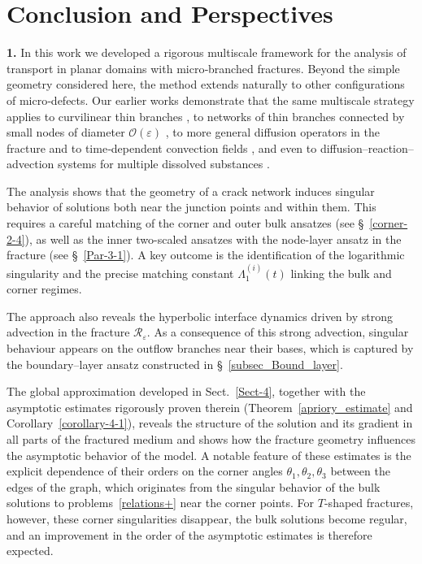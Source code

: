 \documentclass[reqno]{amsart}            %
\numberwithin{equation}{section}
\begin{document}
	
	\section{Conclusion and Perspectives}\label{Sect-5}
	
	\textbf{1.} 	
	In this work we developed a rigorous multiscale framework for the analysis of
	transport in planar domains with micro‑branched fractures. Beyond the simple
	geometry considered here, the method extends naturally to other configurations
	of micro‑defects. Our earlier works demonstrate that the same multiscale
	strategy applies to curvilinear thin branches \cite{Mel-Roh_AA-2024}, to
	networks of thin branches connected by small nodes of diameter
	$\mathcal{O}(\varepsilon)$ \cite{Mel-Roh_JMAA-2024}, to more general diffusion
	operators in the fracture and to time‑dependent convection fields
	\cite{Mel-Roh_JMAA-2024}, and even to diffusion–reaction–advection systems for
	multiple dissolved substances \cite{Mel-Pop-Rohde-preprint-2026}.
	
	The analysis shows that the geometry of a crack network induces singular behavior of solutions both near the junction points and within them. This requires a careful matching of the corner and outer bulk ansatzes (see \S~\ref{corner-2-4}), as well as the inner two-scaled ansatzes with the node-layer ansatz in the fracture (see \S~\ref{Par-3-1}). A key outcome  is the identification of the logarithmic
	singularity and the precise matching constant $\Lambda^{(i)}_1(t)$ linking the bulk and corner regimes.
	
	The approach also reveals the hyperbolic interface dynamics driven by strong
	advection in the fracture $\mathcal{R}_\varepsilon$. As a consequence of this
	strong advection, singular behaviour appears on the outflow branches near their
	bases, which is captured by the boundary–layer ansatz constructed in
	\S~\ref{subsec_Bound_layer}.
	
	The global approximation developed in Sect.~\ref{Sect-4}, together with the
	asymptotic estimates rigorously proven therein (Theorem~\ref{apriory_estimate}
	and Corollary~\ref{corollary-4-1}), reveals the structure of the solution and
	its gradient in all parts of the fractured medium and shows how the fracture
	geometry influences the asymptotic behavior of the model. A notable feature of
	these estimates is the explicit dependence of their orders on the corner angles
	$\theta_1,\theta_2,\theta_3$ between the edges of the graph, which originates
	from the singular behavior of the bulk solutions to problems~\eqref{relations+}
	near the corner points. For $T$-shaped fractures, however, these corner
	singularities disappear, the bulk solutions become regular, and an improvement
	in the order of the asymptotic estimates is therefore expected. 
	
\end{document}

